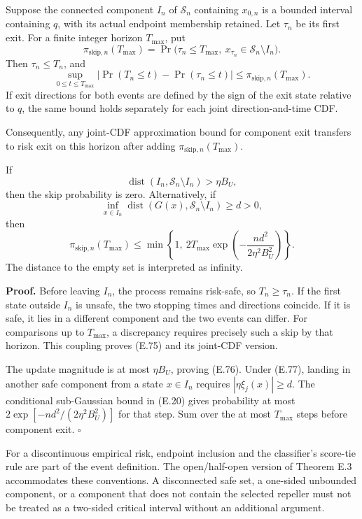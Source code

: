 Suppose the connected component \(I_n\) of \(\mathcal S_n\) containing
\(x_{0,n}\) is a bounded interval containing \(q\), with its actual
endpoint membership retained. Let \(\tau_n\) be its first exit. For a
finite integer horizon \(T_{\max}\), put \[
\pi_{\mathrm{skip},n}(T_{\max})
=\Pr\big(\tau_n\le T_{\max},\
x_{\tau_n}\in\mathcal S_n\setminus I_n\big).
\tag{E.74}
\] Then \(\tau_n\le T_n\), and \[
\sup_{0\le t\le T_{\max}}
\left|\Pr(T_n\le t)-\Pr(\tau_n\le t)\right|
\le \pi_{\mathrm{skip},n}(T_{\max}).
\tag{E.75}
\] If exit directions for both events are defined by the sign of the
exit state relative to \(q\), the same bound holds separately for each
joint direction-and-time CDF.

Consequently, any joint-CDF approximation bound for component exit
transfers to risk exit on this horizon after adding
\(\pi_{\mathrm{skip},n}(T_{\max})\).

If \[
\operatorname{dist}(I_n,\mathcal S_n\setminus I_n)>\eta B_U,
\tag{E.76}
\] then the skip probability is zero. Alternatively, if \[
\inf_{x\in I_n}
\operatorname{dist}(G(x),\mathcal S_n\setminus I_n)\ge d>0,
\tag{E.77}
\] then \[
\pi_{\mathrm{skip},n}(T_{\max})
\le
\min\left\{1,\
2T_{\max}\exp\!\left(-\frac{nd^2}{2\eta^2B_U^2}\right)
\right\}.
\tag{E.78}
\] The distance to the empty set is interpreted as infinity.

\textbf{Proof.} Before leaving \(I_n\), the process remains risk-safe,
so \(T_n\ge\tau_n\). If the first state outside \(I_n\) is unsafe, the
two stopping times and directions coincide. If it is safe, it lies in a
different component and the two events can differ. For comparisons up to
\(T_{\max}\), a discrepancy requires precisely such a skip by that
horizon. This coupling proves (E.75) and its joint-CDF version.

The update magnitude is at most \(\eta B_U\), proving (E.76). Under
(E.77), landing in another safe component from a state \(x\in I_n\)
requires \(|\eta\xi_j(x)|\ge d\). The conditional sub-Gaussian bound in
(E.20) gives probability at most \(2\exp[-nd^2/(2\eta^2B_U^2)]\) for
that step. Sum over the at most \(T_{\max}\) steps before component
exit. \(\square\)

For a discontinuous empirical risk, endpoint inclusion and the
classifier's score-tie rule are part of the event definition. The
open/half-open version of Theorem E.3 accommodates these conventions. A
disconnected safe set, a one-sided unbounded component, or a component
that does not contain the selected repeller must not be treated as a
two-sided critical interval without an additional argument.

